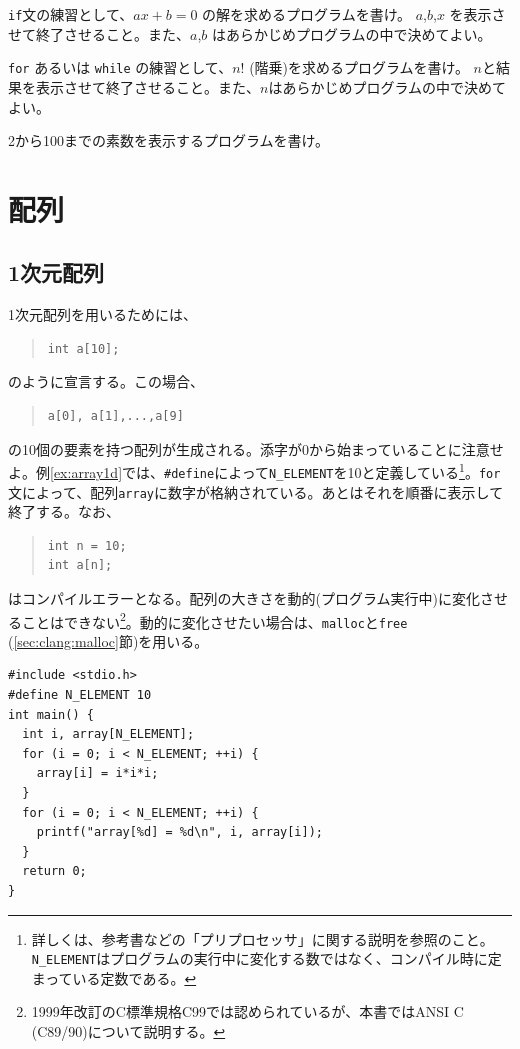 \begin{renshuu}\label{prob:2-1}
\verb|if|文の練習として、$ax+b=0$ の解を求めるプログラムを書け。
$a$,$b$,$x$ を表示させて終了させること。また、$a$,$b$ はあらかじめプログラムの中で決めてよい。
\end{renshuu}

\begin{renshuu}\label{prob:2-2}
\verb|for| あるいは \verb|while| の練習として、$n!$ (階乗)を求めるプログラムを書け。
$n$と結果を表示させて終了させること。また、$n$はあらかじめプログラムの中で決めてよい。
\end{renshuu}

\begin{renshuu}\label{prob:2-3}
2から100までの素数を表示するプログラムを書け。
\end{renshuu}

\section{配列}
\subsection{1次元配列}
1次元配列を用いるためには、
\begin{quote}
\begin{verbatim}
int a[10];
\end{verbatim}
\end{quote}
のように宣言する。この場合、
\begin{quote}
\begin{verbatim}
a[0], a[1],...,a[9]
\end{verbatim}
\end{quote}
の10個の要素を持つ配列が生成される。添字が0から始まっていることに注意せよ。例\ref{ex:array1d}では、\verb|#define|によって\verb|N_ELEMENT|を10と定義している\footnote{詳しくは、参考書などの「プリプロセッサ」に関する説明を参照のこと。{\tt N\_ELEMENT}はプログラムの実行中に変化する数ではなく、コンパイル時に定まっている定数である。}。\verb|for|文によって、配列\verb|array|に数字が格納されている。あとはそれを順番に表示して終了する。なお、
\begin{quote}
\begin{verbatim}
int n = 10;
int a[n];
\end{verbatim}
\end{quote}
はコンパイルエラーとなる。配列の大きさを動的(プログラム実行中)に変化させることはできない\footnote{1999年改訂のC標準規格C99では認められているが、本書ではANSI C (C89/90)について説明する。}。動的に変化させたい場合は、\verb|malloc|と\verb|free| (\ref{sec:clang:malloc}節)を用いる。
\begin{reidai}\label{ex:array1d}
\begin{verbatim}
#include <stdio.h>
#define N_ELEMENT 10
int main() {
  int i, array[N_ELEMENT];
  for (i = 0; i < N_ELEMENT; ++i) {
    array[i] = i*i*i;
  }
  for (i = 0; i < N_ELEMENT; ++i) {
    printf("array[%d] = %d\n", i, array[i]);
  }
  return 0;
}
\end{verbatim}
\end{reidai}

